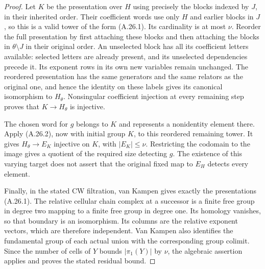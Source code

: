 \begin{proof}
Let $K$ be the presentation over $H$ using precisely
the blocks indexed by $J$, in their inherited order.
Their coefficient words use only $H$ and earlier
blocks in $J$, so this is a valid tower of the form
(A.26.1). Its cardinality is at most $\nu$. Reorder
the full presentation by first attaching these blocks
and then attaching the blocks in $\theta\setminus J$
in their original order. An unselected block has all
its coefficient letters available: selected letters
are already present, and its unselected dependencies
precede it. Its exponent rows in its own new variables
remain unchanged. The reordered presentation has the
same generators and the same relators as the original
one, and hence the identity on these labels gives its
canonical isomorphism to $H_\theta$. Nonsingular
coefficient injection at every remaining step proves
that $K\to H_\theta$ is injective.

The chosen word for $g$ belongs to $K$ and represents
a nonidentity element there. Apply (A.26.2), now with
initial group $K$, to this reordered remaining tower.
It gives $H_\theta\to E_K$ injective on $K$, with
$|E_K|\leq\nu$. Restricting the codomain to the image
gives a quotient of the required size detecting $g$.
The existence of this varying target does not assert
that the original fixed map to $E_H$ detects every
element.

Finally, in the stated CW filtration, van Kampen
gives exactly the presentations (A.26.1). The relative
cellular chain complex at a successor is a finite
free group in degree two mapping to a finite free
group in degree one. Its homology vanishes, so that
boundary is an isomorphism. Its columns are the
relative exponent vectors, which are therefore
independent. Van Kampen also identifies the
fundamental group of each actual union with the
corresponding group colimit. Since the number of
cells of $Y$ bounds $|\pi_1(Y)|$ by $\nu$, the
algebraic assertion applies and proves the stated
residual bound.
\end{proof}
